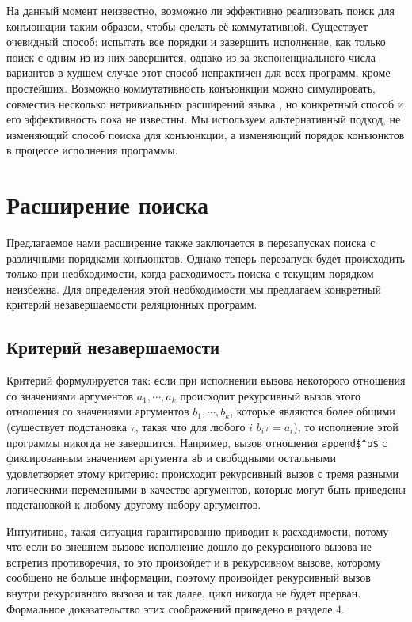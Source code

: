     На данный момент неизвестно, возможно ли эффективно реализовать поиск для конъюнкции таким образом, чтобы сделать её коммутативной. Существует очевидный способ: испытать все порядки и завершить исполнение, как только поиск с одним из из них завершится, однако из-за экспоненциального числа вариантов в худшем случае этот способ непрактичен для всех программ, кроме простейших. Возможно коммутативность конъюнкции можно симулировать, совместив несколько нетривиальных расширений языка \cite{WillThesis}, но конкретный способ и его эффективность пока не известны. Мы используем альтернативный подход, не изменяющий способ поиска для конъюнкции, а изменяющий порядок конъюнктов в процессе исполнения программы.
    
  \section{Расширение поиска}
    
    Предлагаемое нами расширение также заключается в перезапусках поиска с различными порядками конъюнктов. Однако теперь перезапуск будет происходить только при необходимости, когда расходимость поиска с текущим порядком неизбежна. Для определения этой необходимости мы предлагаем конкретный критерий незавершаемости реляционных программ.
    
  \subsection{Критерий незавершаемости}
  
    Критерий формулируется так: если при исполнении вызова некоторого отношения со значениями аргументов $a_1, \cdots, a_k$ происходит рекурсивный вызов этого отношения со значениями аргументов $b_1, \cdots, b_k$, которые являются более общими (существует подстановка $\tau$, такая что для любого $i$ $b_i \tau = a_i$), то исполнение этой программы никогда не завершится. Например, вызов отношения \lstinline|append$^o$| с фиксированным значением аргумента \lstinline|ab| и свободными остальными удовлетворяет этому критерию: происходит рекурсивный вызов с тремя разными логическими переменными в качестве аргументов, которые могут быть приведены подстановкой к любому другому набору аргументов.
    
    Интуитивно, такая ситуация гарантированно приводит к расходимости, потому что если во внешнем вызове исполнение дошло до рекурсивного вызова не встретив противоречия, то это произойдет и в рекурсивном вызове, которому сообщено не больше информации, поэтому произойдет рекурсивный вызов внутри рекурсивного вызова и так далее, цикл никогда не будет прерван. Формальное доказательство этих соображений приведено в разделе 4.
    
